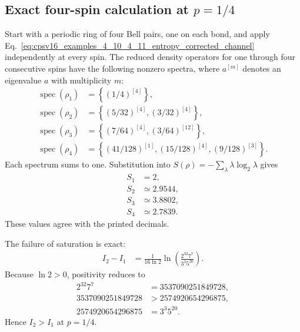 \documentclass{article}
\begin{document}
\subsection{Exact four-spin calculation at $p=1/4$}

Start with a periodic ring of four Bell pairs, one on each bond, and apply
Eq.~\ref{eq:cpsv16_examples_4_10_4_11_entropy_corrected_channel}
independently at every spin. The reduced density operators for one through four
consecutive spins have the following nonzero spectra, where $a^{[m]}$ denotes
an eigenvalue $a$ with multiplicity $m$:
\begin{align}
    \operatorname{spec}(\rho_1)
        &= \left\{(1/4)^{[4]}\right\},
    \label{eq:cpsv16_examples_4_10_4_11_entropy_example410_spectrum_one}\\
    \operatorname{spec}(\rho_2)
        &= \left\{(5/32)^{[4]},(3/32)^{[4]}\right\},
    \label{eq:cpsv16_examples_4_10_4_11_entropy_example410_spectrum_two}\\
    \operatorname{spec}(\rho_3)
        &= \left\{(7/64)^{[4]},(3/64)^{[12]}\right\},
    \label{eq:cpsv16_examples_4_10_4_11_entropy_example410_spectrum_three}\\
    \operatorname{spec}(\rho_4)
        &= \left\{(41/128)^{[1]},(15/128)^{[4]},
            (9/128)^{[3]}\right\}.
    \label{eq:cpsv16_examples_4_10_4_11_entropy_example410_spectrum_four}
\end{align}
Each spectrum sums to one. Substitution into
$S(\rho)=-\sum_\lambda\lambda\log_2\lambda$ gives
\begin{align}
    S_1
        &= 2,
    \label{eq:cpsv16_examples_4_10_4_11_entropy_example410_entropy_one}\\
    S_2
        &\simeq 2.9544,
    \label{eq:cpsv16_examples_4_10_4_11_entropy_example410_entropy_two}\\
    S_3
        &\simeq 3.8802,
    \label{eq:cpsv16_examples_4_10_4_11_entropy_example410_entropy_three}\\
    S_4
        &\simeq 2.7839.
    \label{eq:cpsv16_examples_4_10_4_11_entropy_example410_entropy_four}
\end{align}
These values agree with the printed decimals.

The failure of saturation is exact:
\begin{align}
    I_2-I_1
        &= \frac{1}{16\ln 2}
            \ln\!\left(\frac{2^{32}7^7}{3^3 5^{20}}\right).
    \label{eq:cpsv16_examples_4_10_4_11_entropy_example410_exact_defect}
\end{align}
Because $\ln 2>0$, positivity reduces to
\begin{align}
    2^{32}7^7
        &= 3537090251849728,
    \label{eq:cpsv16_examples_4_10_4_11_entropy_example410_integer_left}\\
    3537090251849728
        &> 2574920654296875,
    \label{eq:cpsv16_examples_4_10_4_11_entropy_example410_integer_strict}\\
    2574920654296875
        &= 3^3 5^{20}.
    \label{eq:cpsv16_examples_4_10_4_11_entropy_example410_integer_right}
\end{align}
Hence $I_2>I_1$ at $p=1/4$.
\end{document}
